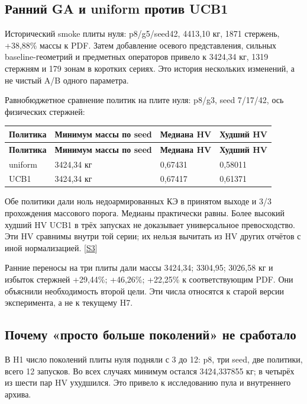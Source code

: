 \documentclass[11pt,a4paper]{article}
\begin{document}
\subsection{Ранний GA и uniform против UCB1}

Исторический smoke плиты нуля: p8/g5/seed42, 4413,10 кг, 1871 стержень, +38,88\% массы к PDF. Затем добавление осевого представления, сильных baseline-геометрий и предметных операторов привело к 3424,34 кг, 1319 стержням и 179 зонам в коротких сериях. Это история нескольких изменений, а не чистый A/B одного параметра.


Равнобюджетное сравнение политик на плите нуля: p8/g3, seed 7/17/42, ось физических стержней:


{\small\setlength{\tabcolsep}{4pt}
\begin{longtable}{@{}L{52.892mm}L{35.780mm}L{35.780mm}L{31.113mm}@{}}
\toprule
\textbf{Политика} & \textbf{Минимум массы по seed} & \textbf{Медиана HV} & \textbf{Худший HV} \\
\midrule\endfirsthead
\toprule
\textbf{Политика} & \textbf{Минимум массы по seed} & \textbf{Медиана HV} & \textbf{Худший HV} \\
\midrule\endhead
\bottomrule\endfoot
uniform & 3424,34 кг & 0,67431 & 0,58011 \\
UCB1 & 3424,34 кг & 0,67417 & 0,61371 \\
\end{longtable}}

Обе политики дали ноль недоармированных КЭ в принятом выходе и 3/3 прохождения массового порога. Медианы практически равны. Более высокий худший HV UCB1 в трёх запусках не доказывает универсальное превосходство. Эти HV сравнимы внутри той серии; их нельзя вычитать из HV других отчётов с иной нормализацией. {\color{Teal}\small[\hyperlink{S3}{S3}]}


Ранние переносы на три плиты дали массы 3424,34; 3304,95; 3026,58 кг и избыток стержней +29,44\%; +46,26\%; +22,25\% к соответствующим PDF. Они объяснили необходимость второй цели. Эти числа относятся к старой версии эксперимента, а не к текущему H7.


\subsection{Почему «просто больше поколений» не сработало}

В H1 число поколений плиты нуля подняли с 3 до 12: p8, три seed, две политики, всего 12 запусков. Во всех случаях минимум остался 3424,337855 кг; в четырёх из шести пар HV ухудшился. Это привело к исследованию пула и внутреннего архива.
\end{document}
